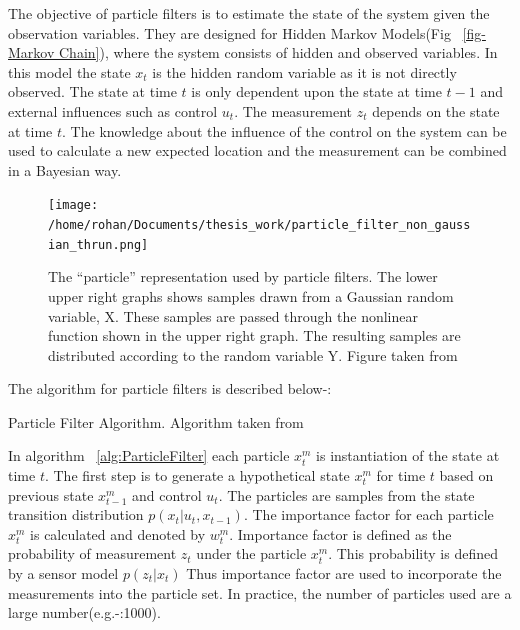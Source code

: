 \documentclass[12pt,draft]{dalcsthesis}
\begin{document}
The objective of particle filters is to estimate the state of the system given the observation variables. They are designed for Hidden Markov Models(Fig ~\ref{fig-Markov Chain}), where the system consists of hidden and observed variables. In this model the state $x_{t}$ is the hidden random variable as it is not directly observed. The state at time $t$ is only dependent upon the state at time $t-1$ and external influences such as control $u_{t}$. The measurement $z_{t}$ depends on the state at time $t$. The knowledge about the influence of the control on the system can be used to calculate a new expected location and the measurement can be combined in a Bayesian way.


\begin{figure}
\centering
{\texttt{[image: /home/rohan/Documents/thesis\_work/particle\_filter\_non\_gaussian\_thrun.png]}}

\caption{\label{fig: partilce representation} The ``particle'' representation used by particle filters. The lower upper right graphs shows samples drawn from a Gaussian random variable, X. These samples are passed through the nonlinear function shown in the upper right graph. The resulting samples are distributed according to the random variable Y. Figure taken from \cite{thrun2005probabilistic}}
\end{figure}

The algorithm for particle filters is described below-:

\begin{algorithm}[H]
\label{alg:ParticleFilter}
 \SetAlgoLined
  		 


\caption{Particle Filter Algorithm. Algorithm taken from \cite{thrun2005probabilistic}}
\end{algorithm}

In algorithm ~\ref{alg:ParticleFilter} each particle $x_{t}^{m}$ is instantiation of the state at time $t$.  The first step is to generate a hypothetical state $x_{t}^{m}$ for time $t$ based on previous state $x_{t-1}^{m}$ and control $u_{t}$. The particles are samples from the state transition distribution $p(x_{t}|u_{t},x_{t-1})$. The importance factor for each particle $x_{t}^{m}$ is calculated and denoted by $w_{t}^{m}$. Importance factor is defined as the probability of measurement $z_{t}$ under the particle $x_{t}^{m}$. This probability is defined by a sensor model $p(z_{t}|x_{t})$ Thus importance factor are used to incorporate the measurements into the particle set. In practice, the number of particles used are a large number(e.g.-:1000).
\end{document}
